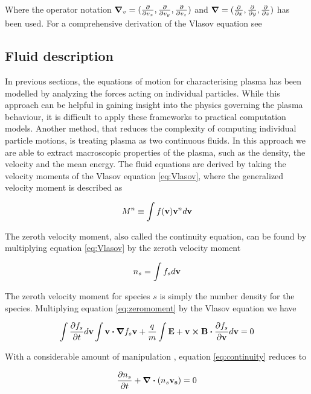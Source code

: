 Where the operator notation $\grad_v = (\pdv{v_x}, \pdv{v_y}, \pdv{v_z})$ and $\grad = (\pdv{x},\pdv{y},\pdv{z})$ has been used. For a comprehensive derivation of the Vlasov equation see 


\subsection{Fluid description}
In previous sections, the equations of motion for characterising plasma has been modelled by analyzing the forces acting on individual particles. While this approach can be helpful in gaining insight into the physics governing the plasma behaviour, it is difficult to apply these frameworks to practical computation models. 
\vskip 1mm
Another method, that reduces the complexity of computing individual particle motions, is treating plasma as two continuous fluids. In this approach we are able to extract macroscopic properties of the plasma, such as the density, the velocity and the mean energy. The fluid equations are derived by taking the velocity moments of the Vlasov equation \ref{eq:Vlasov}, where the generalized velocity moment is described as

\begin{equation}\label{eq:moment}
    M^n \equiv \int f(\vb{v}) \vb{v}^n d \vb{v}
\end{equation}

The zeroth velocity moment, also called the continuity equation, can be found by multiplying equation \ref{eq:Vlasov} by the zeroth velocity moment 

\begin{equation}\label{eq:zeromoment}
    n_s = \int f_s d \vb{v}
\end{equation}

The zeroth velocity moment for species $s$ is simply the number density for the species. Multiplying equation \ref{eq:zeromoment} by the Vlasov equation we have

\begin{equation}\label{eq:continuity}
    \int \pdv{f_s}{t} d \vb{v} \int \vb{v} \vdot \grad{f_s} \vb{v} + \frac{q}{m} \int \vb{E} + \vb{v} \cp \vb{B} \vdot \pdv{f_s}{\vb{v}} d \vb{v} = 0
\end{equation}

With a considerable amount of manipulation , equation \ref{eq:continuity} reduces to

\begin{equation}\label{eq:contReduced}
    \pdv{n_s}{t} + \div{(n_s \vb{v_s})} = 0 
\end{equation}


